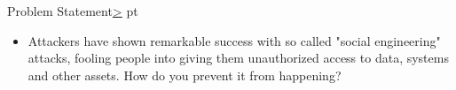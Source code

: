 \documentclass[12pt]{extarticle}
\newenvironment{instructionblock}{\Large\bgroup}{\egroup}
\begin{document}

\pagebreak
{}
\setcounter{section}{1}
\begin{slide}{Problem Statement}{\hyperref[slide 2]{\textgreater}}
	 pt
	\begin{instructionblock}
		\begin{itemize}
			\item Attackers have shown remarkable success with so called "social engineering" attacks, fooling people into giving them unauthorized access to data, systems and other assets. How do you prevent it from happening?
		\end{itemize}
	\end{instructionblock}
\end{slide}
\end{document}
